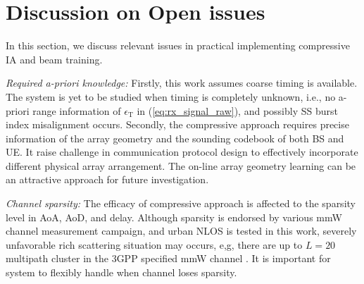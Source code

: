 \documentclass[journal]{IEEEtran}
\newcommand{\STO}[0]{\epsilon_{\text{T}}}
\begin{document}



%  
%
\section{Discussion on Open issues}
\label{sec:discussion}
In this section, we discuss relevant issues in practical implementing compressive IA and beam training. 

\textit{Required a-priori knowledge:} Firstly, this work assumes coarse timing is available. The system is yet to be studied when timing is completely unknown, i.e., no a-priori range information of $\STO$ in (\ref{eq:rx_signal_raw}), and possibly SS burst index misalignment occurs. Secondly, the compressive approach requires precise information of the array geometry and the sounding codebook of both BS and UE. It raise challenge in communication protocol design to effectively incorporate different physical array arrangement. The on-line array geometry learning can be an attractive approach for future investigation. 

\textit{Channel sparsity:} The efficacy of compressive approach is affected to the sparsity level in AoA, AoD, and delay. Although sparsity is endorsed by various mmW channel measurement campaign, and urban NLOS is tested in this work, severely unfavorable rich scattering situation may occurs, e,g, there are up to $L=20$ multipath cluster in the 3GPP specified mmW channel \cite{3GPP_model}. It is important for system to flexibly handle when channel loses sparsity.
\end{document}
